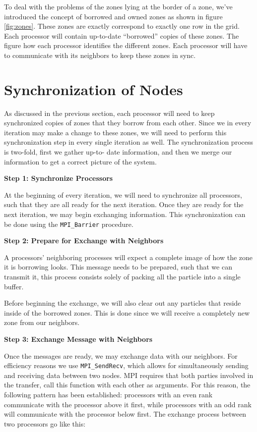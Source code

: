 
To deal with the problems of the zones lying at the border of a zone, we've introduced the concept of borrowed and owned
zones as shown in figure \ref{fig:zones}. These zones are exactly correspond to exactly one row in the grid. Each
processor will contain up-to-date ``borrowed'' copies of these zones. The figure how each processor identifies the
different zones. Each processor will have to communicate with its neighbors to keep these zones in sync.

\section{Synchronization of Nodes}

As discussed in the previous section, each processor will need to keep synchronized copies of zones that they borrow
from each other. Since we in every iteration may make a change to these zones, we will need to perform this
synchronization step in every single iteration as well. The synchronization process is two-fold, first we gather up-to-
date information, and then we merge our information to get a correct picture of the system.

\textbf{Step 1: Synchronize Processors}

At the beginning of every iteration, we will need to synchronize all processors, such that they are all ready for the
next iteration. Once they are ready for the next iteration, we may begin exchanging information. This synchronization
can be done using the \verb!MPI_Barrier! procedure.

\textbf{Step 2: Prepare for Exchange with Neighbors}

A processors' neighboring processes will expect a complete image of how the zone it is borrowing looks. This message 
needs to be prepared, such that we can transmit it, this process consists solely of packing all the particle into a 
single buffer.

Before beginning the exchange, we will also clear out any particles that reside inside of the borrowed zones. This is
done since we will receive a completely new zone from our neighbors.

\textbf{Step 3: Exchange Message with Neighbors}

Once the messages are ready, we may exchange data with our neighbors. For efficiency reasons we use \verb!MPI_SendRecv!,
which allows for simultaneously sending and receiving data between two nodes. MPI requires that both parties involved in
the transfer, call this function with each other as arguments. For this reason, the following pattern has been
established: processors with an even rank communicate with the processor above it first, while processors with an odd
rank will communicate with the processor below first. The exchange process between two processors go like this:

